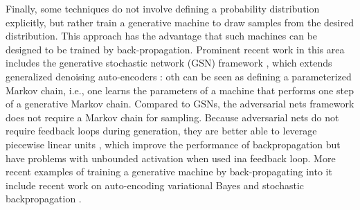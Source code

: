 \noindent Finally, some techniques do not involve defining a probability distribution explicitly, but rather train a generative machine to draw samples from the desired distribution. This approach has the advantage that such machines can be designed to be trained by back-propagation. Prominent recent work in this area includes the generative stochastic network (GSN) framework \cite{5_bengio2014deepgenerativestochasticnetworks}, which extends generalized denoising auto-encoders \cite{4_NIPS2013_559cb990}: oth can be seen as defining a parameterized Markov chain, i.e., one learns the parameters of a machine that performs one step of a generative Markov chain. Compared to GSNs, the adversarial nets framework does not require a Markov chain for sampling. Because adversarial nets do not require feedback loops during generation, they are better able to leverage piecewise linear units \cite{19_5459469,9_pmlr-v15-glorot11a,10_goodfellow2013maxoutnetworks}, which improve the performance of backpropagation but have problems with unbounded activation when used ina feedback loop. More recent examples of training a generative machine by back-propagating into it include recent work on auto-encoding variational Bayes \cite{20_kingma2022autoencodingvariationalbayes} and stochastic backpropagation \cite{24_rezende2014stochasticbackpropagationapproximateinference}.
